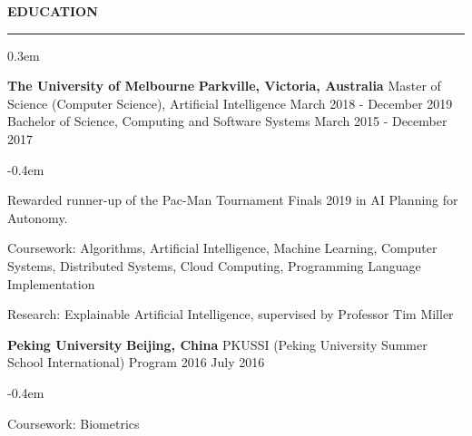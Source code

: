 \documentclass{cv}
\begin{document}
 \textbf{EDUCATION}
\sectionlineskip
\hrule
\begin{list}{}{\setlength{\leftmargin}{0em}}
\itemsep 0.3em
\item[]
    \textbf{The University of Melbourne} \hfill \textbf{Parkville, Victoria, Australia}%
    \vspace{0.1em} \newline
    {Master of Science (Computer Science), Artificial Intelligence} \hfill {March 2018 - December 2019}%
    \newline
    {Bachelor of Science, Computing and Software Systems} \hfill {March 2015 - December 2017}%
    \begin{list}{\raisebox{0.2em}{\tiny$\bullet$}}{\leftmargin=1.0em}
    \itemsep -0.4em \vspace{-0.4em}
        \item Rewarded runner-up of the Pac-Man Tournament Finals 2019 in AI Planning for Autonomy.
        \item Coursework: Algorithms, Artificial Intelligence, Machine Learning, Computer Systems, Distributed Systems, Cloud Computing, Programming Language Implementation
        \item Research: Explainable Artificial Intelligence, supervised by Professor Tim Miller
    \end{list}
\item[]
    \textbf{Peking University} \hfill \textbf{Beijing, China}%
    \vspace{0.1em} \newline 
    {PKUSSI (Peking University Summer School International) Program 2016} \hfill {July 2016}%
    \begin{list}{\raisebox{0.2em}{\tiny$\bullet$}}{\leftmargin=1.0em}
    \itemsep -0.4em \vspace{-0.4em}
        \item Coursework: Biometrics
    \end{list}
\end{list}

\end{document}
